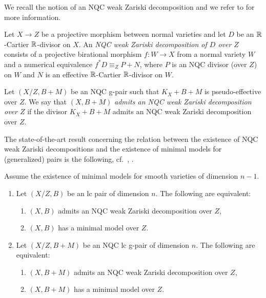 	We recall the notion of an NQC weak Zariski decomposition and we refer to \cite{Bir12b,HanLi22,LT22a,LT22b} for more information.
	
	\begin{dfn}\label{dfn:NQC_WZD}
		Let $ X \to Z $ be a projective morphism between normal varieties and let $ D $ be an $ \mathbb{R} $-Cartier $\mathbb{R}$-divisor on $ X $. An \emph{NQC weak Zariski decomposition of $ D $ over $Z$} consists of a projective birational morphism $ f \colon W \to X $ from a normal variety $ W $ and a numerical equivalence $ f^* D \equiv_Z P + N $, where $ P $ is an NQC divisor (over $ Z $) on $ W $ and $ N $ is an effective $\mathbb{R}$-Cartier $\mathbb{R}$-divisor on $W$.
		
		Let $ (X/Z,B+M) $ be an NQC g-pair such that $ K_X+B+M $ is pseudo-effective over $ Z $. We say that $ (X,B+M) $ \emph{admits an NQC weak Zariski decomposition over $Z$} if the divisor $ K_X + B + M $ admits an NQC weak Zariski decomposition over $Z$.
	\end{dfn}
	
	The state-of-the-art result concerning the relation between the existence of NQC weak Zariski decompositions and the existence of minimal models for (generalized) pairs is the following, cf.\ \cite[Theorem 1.5]{Bir12b}, \cite[Theorem 1.5]{HanLi22}.
	
	\begin{thm}\label{thm:MM_NQC_WZD}
		Assume the existence of minimal models for smooth varieties of dimension $n-1$. 
		
		\begin{enumerate}[\normalfont (i)]
			\item Let $ (X/Z,B) $ be an lc pair of dimension $ n $. The following are equivalent:
			\begin{enumerate}[\normalfont (1)]
				\item $ (X,B) $ admits an NQC weak Zariski decomposition over $Z$,
				
				\item $ (X,B) $ has a minimal model over $Z$.
			\end{enumerate}
			
			\item Let $ (X/Z,B+M) $ be an NQC lc g-pair of dimension $ n $. The following are equivalent:
			\begin{enumerate}[\normalfont (1)]
				\item $ (X,B+M) $ admits an NQC weak Zariski decomposition over $Z$,
				
				\item $ (X,B+M) $ has a minimal model over $Z$.
			\end{enumerate}
		\end{enumerate}
	\end{thm}
	
